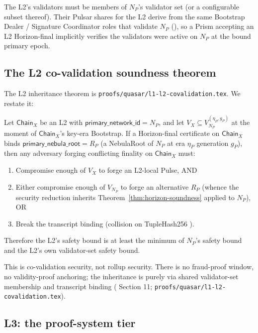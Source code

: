 The L2's validators must be members of $N_P$'s validator set (or a configurable subset thereof). Their Pulsar shares for the L2 derive from the same Bootstrap Dealer / Signature Coordinator roles that validate $N_P$ (\cite{luxlssmpc,lp077}), so a Prism accepting an L2 Horizon-final implicitly verifies the validators were active on $N_P$ at the bound primary epoch.

\subsection{The L2 co-validation soundness theorem}

The L2 inheritance theorem is \texttt{proofs/quasar/l1-l2-covalidation.tex}. We restate it:

\begin{theorem}
\label{thm:l2-covalidation}
Let $\mathsf{Chain}_X$ be an L2 with $\mathsf{primary\_network\_id} = N_P$, and let $V_X \subseteq V_{N_P}^{(\eta_P, g_P)}$ at the moment of $\mathsf{Chain}_X$'s key-era Bootstrap. If a Horizon-final certificate on $\mathsf{Chain}_X$ binds $\mathsf{primary\_nebula\_root} = R_P$ (a NebulaRoot of $N_P$ at era $\eta_P$ generation $g_P$), then any adversary forging conflicting finality on $\mathsf{Chain}_X$ must:
\begin{enumerate}[leftmargin=2em,nosep]
  \item Compromise enough of $V_X$ to forge an L2-local Pulse, AND
  \item Either compromise enough of $V_{N_P}$ to forge an alternative $R_P$ (whence the security reduction inherits Theorem~\ref{thm:horizon-soundness} applied to $N_P$), OR
  \item Break the transcript binding (collision on TupleHash256 \cite{nistsp800185}).
\end{enumerate}
Therefore the L2's safety bound is at least the minimum of $N_P$'s safety bound and the L2's own validator-set safety bound.
\end{theorem}

This is co-validation security, not rollup security. There is no fraud-proof window, no validity-proof anchoring; the inheritance is purely via shared validator-set membership and transcript binding (\cite{luxpulsar} Section 11; \texttt{proofs/quasar/l1-l2-covalidation.tex}).

\subsection{L3: the proof-system tier}

